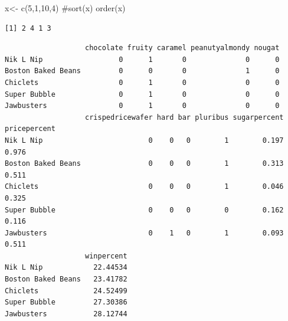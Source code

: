 \documentclass[
  letterpaper,
  DIV=11,
  numbers=noendperiod]{scrartcl}
\newenvironment{Shaded}{\begin{snugshade}}{\end{snugshade}}
\newcommand{\CommentTok}[1]{\textcolor[rgb]{0.37,0.37,0.37}{#1}}
\newcommand{\DecValTok}[1]{\textcolor[rgb]{0.68,0.00,0.00}{#1}}
\newcommand{\FunctionTok}[1]{\textcolor[rgb]{0.28,0.35,0.67}{#1}}
\newcommand{\NormalTok}[1]{\textcolor[rgb]{0.00,0.23,0.31}{#1}}
\newcommand{\OtherTok}[1]{\textcolor[rgb]{0.00,0.23,0.31}{#1}}
\newcommand{\SpecialCharTok}[1]{\textcolor[rgb]{0.37,0.37,0.37}{#1}}
\begin{document}
\begin{Shaded}
\begin{Highlighting}[]
\NormalTok{x}\OtherTok{\textless{}{-}} \FunctionTok{c}\NormalTok{(}\DecValTok{5}\NormalTok{,}\DecValTok{1}\NormalTok{,}\DecValTok{10}\NormalTok{,}\DecValTok{4}\NormalTok{)}
\CommentTok{\#sort(x)}
\FunctionTok{order}\NormalTok{(x)}
\end{Highlighting}
\end{Shaded}

\begin{verbatim}
[1] 2 4 1 3
\end{verbatim}

\begin{Shaded}
\end{Shaded}

\begin{Shaded}
\end{Shaded}

\begin{verbatim}
                   chocolate fruity caramel peanutyalmondy nougat
Nik L Nip                  0      1       0              0      0
Boston Baked Beans         0      0       0              1      0
Chiclets                   0      1       0              0      0
Super Bubble               0      1       0              0      0
Jawbusters                 0      1       0              0      0
                   crispedricewafer hard bar pluribus sugarpercent pricepercent
Nik L Nip                         0    0   0        1        0.197        0.976
Boston Baked Beans                0    0   0        1        0.313        0.511
Chiclets                          0    0   0        1        0.046        0.325
Super Bubble                      0    0   0        0        0.162        0.116
Jawbusters                        0    1   0        1        0.093        0.511
                   winpercent
Nik L Nip            22.44534
Boston Baked Beans   23.41782
Chiclets             24.52499
Super Bubble         27.30386
Jawbusters           28.12744
\end{verbatim}
\end{document}
